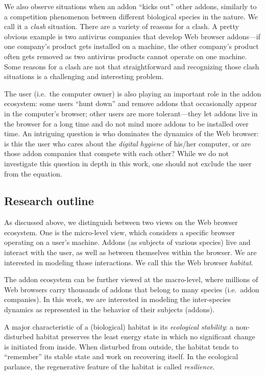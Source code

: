 \documentclass[ijoc,nonblindrev]{informs3} %
\numberwithin{equation}{subsection}
\begin{document}
We also observe situations when an addon ``kicks out'' other addons, similarly to a competition phenomenon between different biological species in the nature. We call it a \emph{clash} situation. There are a variety of reasons for a clash. A pretty obvious example is two antivirus companies that develop Web browser addons---if one company's product gets installed on a machine, the other company's product often gets removed as two antivirus products cannot operate on one machine. Some reasons for a clash are not that straightforward and recognizing those clash situations is a challenging and interesting problem.

The user (i.e.~the computer owner) is also playing an important role in the addon ecosystem: some users ``hunt down'' and remove addons that occasionally appear in the computer's browser; other users are more tolerant---they let addons live in the browser for a long time and do not mind more addons to be installed over time. An intriguing question is who dominates the dynamics of the Web browser: is this the user who cares about the \emph{digital hygiene} of his/her computer, or are those addon companies that compete with each other? While we do not investigate this question in depth in this work, one should not exclude the user from the equation.

\subsection{Research outline}

As discussed above, we distinguish between two views on the Web browser ecosystem. One is the micro-level view, which considers a specific browser operating on a user's machine. Addons (as subjects of various species) live and interact with the user, as well as between themselves within the browser. We are interested in modeling those interactions. We call this the Web browser \emph{habitat}. 

The addon ecosystem can be further viewed at the macro-level, where millions of Web browsers carry thousands of addons that belong to many species (i.e.~addon companies). In this work, we are interested in modeling the inter-species dynamics as represented in the behavior of their subjects (addons).

A major characteristic of a (biological) habitat is its \emph{ecological stability}: a non-disturbed habitat preserves the least energy state in which no significant change is initiated from inside. When disturbed from outside, the habitat tends to ``remember'' its stable state and work on recovering itself. In the ecological parlance, the regenerative feature of the habitat is called \emph{resilience}. 
\end{document}
